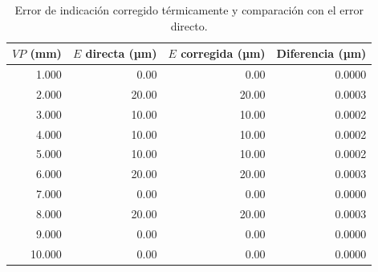 \begin{table}[H]
\centering
\caption{Error de indicación corregido térmicamente y comparación con el error directo.}
\label{tab:reloj-correccion}
\begin{tabular}{rrrr}
\toprule
$VP$ (mm) & $E$ directa (µm) & $E$ corregida (µm) & Diferencia (µm) \\
\midrule
1.000 & 0.00 & 0.00 & 0.0000 \\
2.000 & 20.00 & 20.00 & 0.0003 \\
3.000 & 10.00 & 10.00 & 0.0002 \\
4.000 & 10.00 & 10.00 & 0.0002 \\
5.000 & 10.00 & 10.00 & 0.0002 \\
6.000 & 20.00 & 20.00 & 0.0003 \\
7.000 & 0.00 & 0.00 & 0.0000 \\
8.000 & 20.00 & 20.00 & 0.0003 \\
9.000 & 0.00 & 0.00 & 0.0000 \\
10.000 & 0.00 & 0.00 & 0.0000 \\
\bottomrule
\end{tabular}
\end{table}
